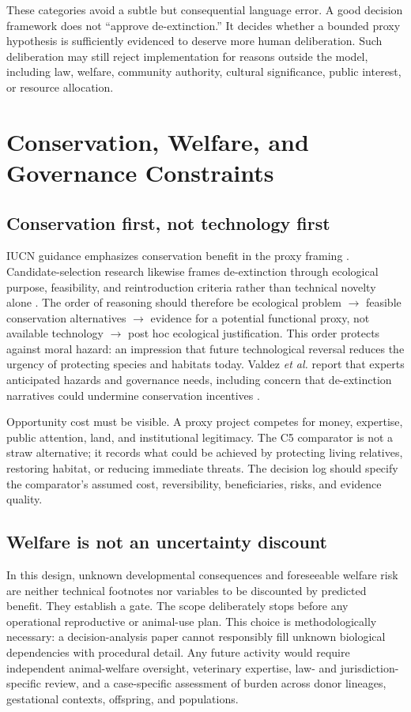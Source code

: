 \documentclass[conference]{IEEEtran}
\begin{document}
These categories avoid a subtle but consequential language error. A good decision framework does not ``approve de-extinction.'' It decides whether a bounded proxy hypothesis is sufficiently evidenced to deserve more human deliberation. Such deliberation may still reject implementation for reasons outside the model, including law, welfare, community authority, cultural significance, public interest, or resource allocation.

\section{Conservation, Welfare, and Governance Constraints}

\subsection{Conservation first, not technology first}

IUCN guidance emphasizes conservation benefit in the proxy framing \cite{iucn2016}. Candidate-selection research likewise frames de-extinction through ecological purpose, feasibility, and reintroduction criteria rather than technical novelty alone \cite{seddon2014}. The order of reasoning should therefore be ecological problem $\rightarrow$ feasible conservation alternatives $\rightarrow$ evidence for a potential functional proxy, not available technology $\rightarrow$ post hoc ecological justification. This order protects against moral hazard: an impression that future technological reversal reduces the urgency of protecting species and habitats today. Valdez \emph{et al.} report that experts anticipated hazards and governance needs, including concern that de-extinction narratives could undermine conservation incentives \cite{valdez2019}.

Opportunity cost must be visible. A proxy project competes for money, expertise, public attention, land, and institutional legitimacy. The C5 comparator is not a straw alternative; it records what could be achieved by protecting living relatives, restoring habitat, or reducing immediate threats. The decision log should specify the comparator's assumed cost, reversibility, beneficiaries, risks, and evidence quality.

\subsection{Welfare is not an uncertainty discount}

In this design, unknown developmental consequences and foreseeable welfare risk are neither technical footnotes nor variables to be discounted by predicted benefit. They establish a gate. The scope deliberately stops before any operational reproductive or animal-use plan. This choice is methodologically necessary: a decision-analysis paper cannot responsibly fill unknown biological dependencies with procedural detail. Any future activity would require independent animal-welfare oversight, veterinary expertise, law- and jurisdiction-specific review, and a case-specific assessment of burden across donor lineages, gestational contexts, offspring, and populations.
\end{document}
